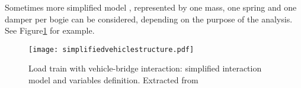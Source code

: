 Sometimes more simplified model , represented by one mass, one spring and one damper per bogie can be considered, depending on the purpose of the analysis. See Figure\ref{fig:simplified-vehicle-structure} for example.

\begin{figure}[h]
	\centering
	\texttt{[image: simplifiedvehiclestructure.pdf]}
	\caption{Load train with vehicle-bridge interaction: simplified interaction model and variables definition. Extracted from \cite[Figure15]{lei2002analyses}}
	\label{fig:simplified-vehicle-structure}
\end{figure}
